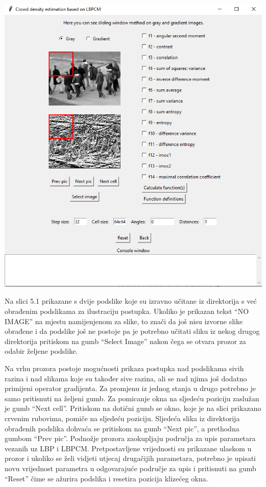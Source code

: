 \documentclass[times, utf8, zavrsni, numeric]{fer}
\begin{document}
\begin{minipage}{\linewidth}
\centering
\includegraphics[scale=0.6]{img/sw1.png}
\end{minipage}

\bigbreak

Na slici 5.1 prikazane s dvije podslike koje su izravno učitane iz direktorija
s već obrađenim podslikama za ilustraciju postupka. Ukoliko je prikazan tekst 
\enquote{NO IMAGE} na mjestu namijenjenom za slike, to znači da još nisu 
izvorne slike obrađene i da podslike 
još ne postoje pa je potrebno učitati sliku iz nekog drugog direktorija pritiskom 
na gumb \enquote{Select Image} nakon čega se otvara prozor za odabir željene podslike.

\newpage

Na vrhu prozora postoje mogućnosti prikaza postupka nad podslikama sivih
razina i nad slikama koje su također sive razina, ali se nad njima još dodatno 
primijeni operator gradijenta. Za promjenu iz jednog stanja u
drugo potrebno je samo pritisnuti na željeni gumb. Za pomicanje okna na sljedeću
poziciju zaslužan je gumb \enquote{Next cell}. Pritiskom na dotični gumb se okno, koje
je na slici prikazano crvenim rubovima, pomiče na sljedeću poziciju. Sljedeća slika iz 
direktorija obrađenih podslika dohvaća se pritiskom na gumb \enquote{Next pic}, a 
prethodna gumbom \enquote{Prev pic}. Podnožje prozora zaokupljaju 
područja za upis parametara vezanih uz LBP i LBPCM. Pretpostavljene vrijednosti
su prikazane ulaskom u prozor i ukoliko se želi vidjeti utjecaj drugačijih parametara,
potrebno je upisati novu vrijednost parametra u odgovarajuće područje za upis i
pritisnuti na gumb \enquote{Reset} čime se ažurira podslika i resetira pozicija 
klizećeg okna.
\end{document}

